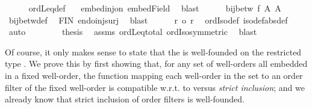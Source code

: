 \begin{isabellebody}
\ \ \ \ \isamarkupfalse%
\ ordLeq{\isacharunderscore}{\kern0pt}def\ \isamarkupfalse%
\ {}\ embed{\isacharunderscore}{\kern0pt}inj{\isacharunderscore}{\kern0pt}on\ embed{\isacharunderscore}{\kern0pt}Field\ \isamarkupfalse%
\ blast\isanewline
\ \ \ \ \isamarkupfalse%
\ {\isachardoublequoteopen}bij{\isacharunderscore}{\kern0pt}betw\ f\ A\ A{\isachardoublequoteclose}\ \isamarkupfalse%
\ bij{\isacharunderscore}{\kern0pt}betw{\isacharunderscore}{\kern0pt}def\ \isamarkupfalse%
\ FIN\ endo{\isacharunderscore}{\kern0pt}inj{\isacharunderscore}{\kern0pt}surj\ \isamarkupfalse%
\ blast\isanewline
\ \ \ \ \isamarkupfalse%
\ {\isachardoublequoteopen}r\ {\isacharequal}{\kern0pt}o\ r{\isacharprime}{\kern0pt}{\isachardoublequoteclose}\ \isamarkupfalse%
\ ordIso{\isacharunderscore}{\kern0pt}def\ iso{\isacharunderscore}{\kern0pt}def{\isacharbrackleft}{\kern0pt}abs{\isacharunderscore}{\kern0pt}def{\isacharbrackright}{\kern0pt}\ \isamarkupfalse%
\ {}\ {}\ \isamarkupfalse%
\ auto\isanewline
\ \ \isamarkupfalse%
\isanewline
\ \ \isamarkupfalse%
\ \isamarkupfalse%
\ {\isacharquery}{\kern0pt}thesis\ \isamarkupfalse%
\ assms\ ordLeq{\isacharunderscore}{\kern0pt}total\ ordIso{\isacharunderscore}{\kern0pt}symmetric\ \isamarkupfalse%
\ blast\isanewline
{}\isamarkupfalse%
%
\endisatagproof
{\isafoldproof}%
%
\isadelimproof
%
\endisadelimproof
%
\isadelimdocument
%
\endisadelimdocument
%
\isatagdocument
%
\isamarkuptrue%
%
\endisatagdocument
{\isafolddocument}%
%
\isadelimdocument
%
\endisadelimdocument
%
\begin{isamarkuptext}%
Of course, it only makes sense to state that the  is well-founded
on the restricted type .  We prove this by first showing that, for any set
of well-orders all embedded in a fixed well-order, the function mapping each well-order
in the set to an order filter of the fixed well-order is compatible w.r.t. to  versus
{\em strict inclusion}; and we already know that strict inclusion of order filters is well-founded.%
\end{isamarkuptext}\isamarkuptrue%
\isamarkupfalse%

\end{isabellebody}
